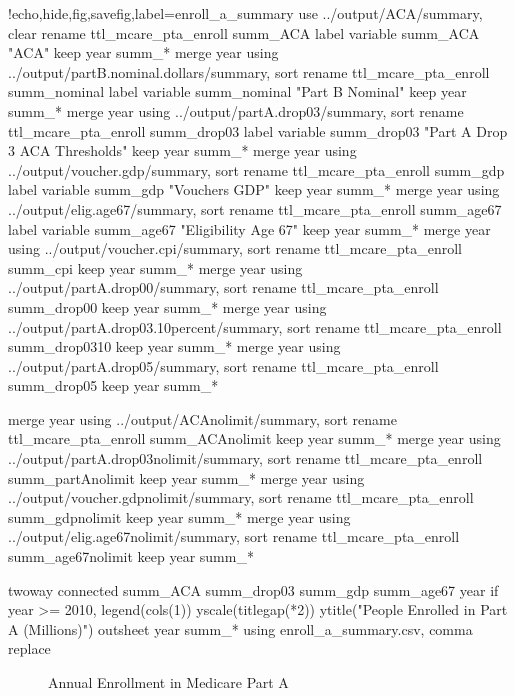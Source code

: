 \documentclass{article}
\begin{document}
\begin{Statacode}{!echo,hide,fig,savefig,label=enroll_a_summary}
use ../output/ACA/summary, clear
rename ttl_mcare_pta_enroll summ_ACA
label variable summ_ACA "ACA"
keep year summ_*
merge year using ../output/partB.nominal.dollars/summary, sort
rename ttl_mcare_pta_enroll summ_nominal
label variable summ_nominal "Part B Nominal"
keep year summ_*
merge year using ../output/partA.drop03/summary, sort
rename ttl_mcare_pta_enroll summ_drop03
label variable summ_drop03 "Part A Drop 3 ACA Thresholds"
keep year summ_*
merge year using ../output/voucher.gdp/summary, sort
rename ttl_mcare_pta_enroll summ_gdp
label variable summ_gdp "Vouchers GDP"
keep year summ_*
merge year using ../output/elig.age67/summary, sort
rename ttl_mcare_pta_enroll summ_age67
label variable summ_age67 "Eligibility Age 67"
keep year summ_*
merge year using ../output/voucher.cpi/summary, sort
rename ttl_mcare_pta_enroll summ_cpi
keep year summ_*
merge year using ../output/partA.drop00/summary, sort
rename ttl_mcare_pta_enroll summ_drop00
keep year summ_*
merge year using ../output/partA.drop03.10percent/summary, sort
rename ttl_mcare_pta_enroll summ_drop0310
keep year summ_*
merge year using ../output/partA.drop05/summary, sort
rename ttl_mcare_pta_enroll summ_drop05
keep year summ_*

merge year using ../output/ACAnolimit/summary, sort
rename ttl_mcare_pta_enroll summ_ACAnolimit
keep year summ_*
merge year using ../output/partA.drop03nolimit/summary, sort
rename ttl_mcare_pta_enroll summ_partAnolimit
keep year summ_*
merge year using ../output/voucher.gdpnolimit/summary, sort
rename ttl_mcare_pta_enroll summ_gdpnolimit
keep year summ_*
merge year using ../output/elig.age67nolimit/summary, sort
rename ttl_mcare_pta_enroll summ_age67nolimit
keep year summ_*


twoway connected summ_ACA summ_drop03 summ_gdp summ_age67 year if year >= 2010, legend(cols(1)) yscale(titlegap(*2)) ytitle("People Enrolled in Part A (Millions)")
outsheet year summ_* using enroll_a_summary.csv, comma replace
\end{Statacode}

\begin{figure}[ht]
\centering
{}
\caption{Annual Enrollment in Medicare Part A}
\end{figure}
\end{document}
